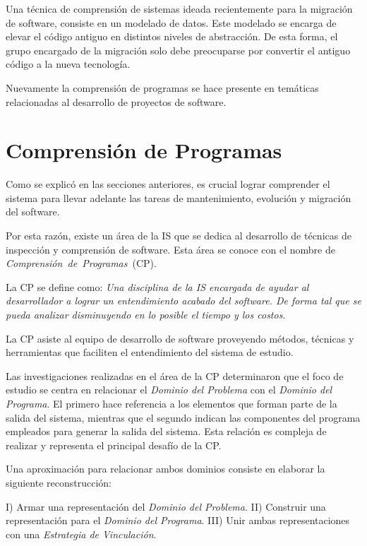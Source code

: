 \documentclass[a4paper,12pt]{report}
\begin{document}
Una técnica de comprensión de sistemas ideada recientemente para la migración de software, consiste en un mode\-lado de datos\cite{WHAFVR11}. Este modelado se encarga de elevar el código antiguo en distintos niveles de abstracción. De esta forma, el grupo encargado de la migración solo debe preocuparse por convertir el antiguo código a la nueva tecnología.

Nuevamente la comprensión de programas se hace presente en temáticas relacionadas al desarrollo de proyectos de software.

\section{Comprensión de Programas}

Como se explicó en las secciones anteriores, es crucial lograr comprender el sistema para llevar adelante las tareas de mantenimiento, evolución y migración del software.
	
Por esta razón, existe un área de la IS que se dedica al desarrollo de técnicas de inspección y comprensión de software. Esta área se conoce con el nombre de \mbox{\textit{Comprensión de Programas} (CP).}

La CP se define como: \textit{Una disciplina de la IS encargada de ayudar al desarrollador a lograr un entendimiento acabado del software. De forma tal que se pueda analizar disminuyendo en lo posible el tiempo y los costos}\cite{MPMR07}.  

La CP asiste al equipo de desarrollo de software proveyendo métodos, técnicas y herramientas que faciliten el entendimiento del sistema de estudio.

Las investigaciones realizadas en el área de la CP determinaron que el foco de estudio se centra en relacionar el \textit{Dominio del Problema} con el \textit{Dominio del Programa}\cite{BRM10,MPMR07,MBPHRU10}. El primero hace referencia a los elementos que forman parte de la salida del sistema, mientras que el segundo indican las componentes del programa empleados para generar la salida del sistema.
Esta relación es compleja de realizar y representa el principal desafío de la CP. 

Una aproximación para relacionar ambos dominios consiste en elaborar la siguiente reconstrucción:

I) Armar una representación del \textit{Dominio del Problema}. II) Construir una representación para el \textit{Dominio del Programa}. III) Unir ambas representaciones con una \textit{Estrategia de Vinculación}.
\end{document}
